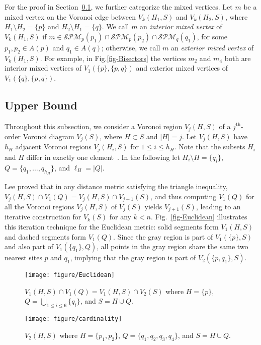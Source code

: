 \documentclass[11pt]{llncs}
\newcommand{\SPM}{\ensuremath{\mathcal{SPM}}}
\begin{document}
For the proof in Section~\ref{sub-upper},
we further categorize the mixed vertices.
Let $m$ be a mixed vertex on the Voronoi edge between $V_k(H_1,S)$ and $V_k(H_2,S)$,
where $H_1\setminus H_2=\{p\}$ and $H_2\setminus H_1=\{q\}$.
We call $m$  an \emph{interior mixed vertex} of $V_k(H_1,S)$
if $m\in \SPM_p(p_1)\cap \SPM_p(p_2)\cap \SPM_q(q_1)$, for some $p_1, p_2 \in A(p)$ and $q_1\in A(q)$;
otherwise, we call $m$ an \emph{exterior mixed vertex} of $V_k(H_1,S)$.
For example, in Fig.\ref{fig-Bisectors}
the vertices $m_2$ and $m_4$ both are interior mixed vertices of $V_1(\{p\}, \{p,q\})$ and exterior mixed vertices of $V_1(\{q\}, \{p,q\})$.


\subsection{Upper Bound}\label{sub-upper}
Throughout this subsection,
we consider a Voronoi region $V_j(H, S)$ of a $j^{\mathrm{th}}$-order Voronoi diagram $V_{j}(S)$,
where $H\subset S$ and $|H|=j$.
Let $V_j(H, S)$ have $h_H$ adjacent Voronoi regions $V_j(H_i, S)$ for $1\leq i\leq h_H$.
Note that the subsets $H_i$ and $H$ differ in exactly one element~\cite{Lee-82}. In the following let
$H_i \setminus H=\{q_i\}$, $Q = \{q_1, \ldots, q_{h_H}\}$, and $\ell_H=|Q|$.

Lee \cite{Lee-82} proved that in any distance metric satisfying the triangle inequality,
$V_j(H, S)\cap V_1(Q) = V_j(H, S)\cap V_{j+1}(S)$,
and thus computing $V_1(Q)$ for all the Voronoi regions $V_j(H, S)$ of $V_j(S)$ yields $V_{j+1}(S)$,
leading to an iterative construction for $V_k(S)$ for any $k< n$.
Fig.~\ref{fig-Euclidean} illustrates this iteration technique for the Euclidean metric:
solid segments form $V_1(H, S)$ and dashed segments form $V_1(Q)$.
Since the gray region is part of $V_1(\{p\}, S)$ and also part of $V_1(\{q_1\}, Q)$,
all points in the gray region share the same two nearest sites $p$ and $q_1$,
implying that the gray region is part of $V_2(\{p, q_1\}, S)$.


\begin{figure}[t]
\begin{center}
\begin{minipage}[b]{0.5\textwidth}
 \centering
 \texttt{[image: figure/Euclidean]}
 \caption{$V_1(H, S)\cap V_1(Q) = V_1(H, S)\cap V_{2}(S)$
 where $H=\{p\}$, $Q=\bigcup_{1\leq i\leq 6} \{q_i\}$, and $S=H\cup Q$.}
 \label{fig-Euclidean}
\end{minipage}
\hfill
\begin{minipage}[b]{0.43\textwidth}
 \centering
 \texttt{[image: figure/cardinality]}
 \caption{$V_2(H,S)$ where $H=\{p_1, p_2\}$, $Q=\{q_1,q_2,q_3,q_4\}$, and $S=H\cup Q$.  }
 \label{fig-cardinality}
\end{minipage}
\end{center}
\end{figure}
\end{document}
